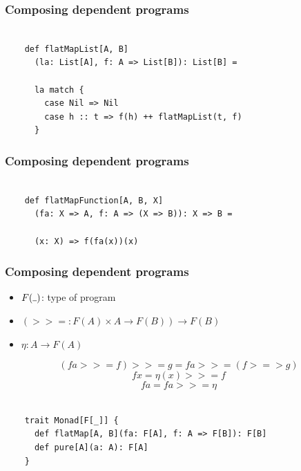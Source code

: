 \documentclass{beamer}
\begin{document}
\begin{frame}[fragile]

  \frametitle{Composing dependent programs}

  \begin{verbatim}

    def flatMapList[A, B]
      (la: List[A], f: A => List[B]): List[B] =

      la match {
        case Nil => Nil
        case h :: t => f(h) ++ flatMapList(t, f)
      }

  \end{verbatim}

\end{frame}

\begin{frame}[fragile]

  \frametitle{Composing dependent programs}

  \begin{verbatim}

    def flatMapFunction[A, B, X]
      (fa: X => A, f: A => (X => B)): X => B =

      (x: X) => f(fa(x))(x)

  \end{verbatim}

\end{frame}

\newcommand{\kcomp}{>\!=\!>}
\newcommand{\bind}{>\!\!>\!=}

\begin{frame}

  \frametitle{Composing dependent programs}
  \Large

  \begin{itemize}
    \item $F(\rule{1ex}{.4pt})$: type of program \pause
    \item $(\bind: F(A) \times A \rightarrow F(B)) \rightarrow F(B)$ \pause
    \item $\eta: A \rightarrow F(A)$ \pause
  \end{itemize}

  $$(fa \bind f) \bind g = fa \bind (f \kcomp g)$$
  $$f x = \eta(x) \bind f$$
  $$fa = fa \bind \eta$$

\end{frame}

\begin{frame}[fragile]

  \begin{verbatim}

    trait Monad[F[_]] {
      def flatMap[A, B](fa: F[A], f: A => F[B]): F[B]
      def pure[A](a: A): F[A]
    }

  \end{verbatim}

\end{frame}
\end{document}
